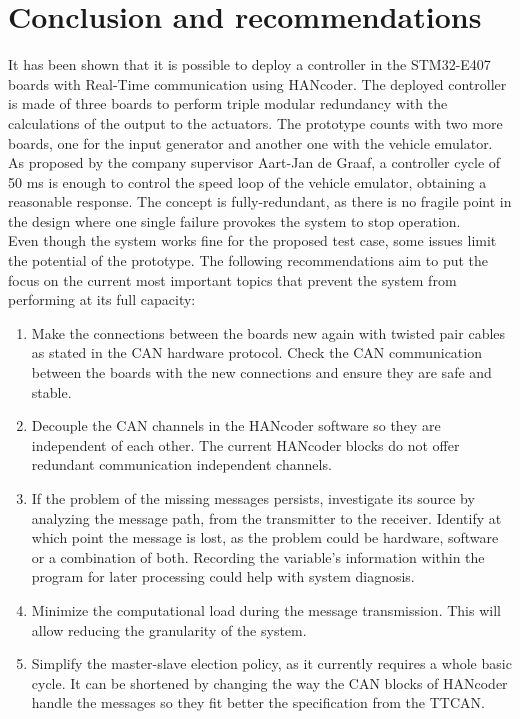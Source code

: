 \documentclass[table,xcdraw]{article}
\begin{document}
\newpage
\section{Conclusion and recommendations} \label{sec:Conclusion}
It has been shown that it is possible to deploy a controller in the STM32-E407 boards with Real-Time communication using HANcoder. The deployed controller is made of three boards to perform triple modular redundancy with the calculations of the output to the actuators. The prototype counts with two more boards, one for the input generator and another one with the vehicle emulator. As proposed by the company supervisor Aart-Jan de Graaf, a controller cycle of 50 ms is enough to control the speed loop of the vehicle emulator, obtaining a reasonable response. The concept is fully-redundant, as there is no fragile point in the design where one single failure provokes the system to stop operation.\\

Even though the system works fine for the proposed test case, some issues limit the potential of the prototype. The following recommendations aim to put the focus on the current most important topics that prevent the system from performing at its full capacity:
\begin{enumerate}
    \item Make the connections between the boards new again with twisted pair cables as stated in the CAN hardware protocol. Check the CAN communication between the boards with the new connections and ensure they are safe and stable.
    \item Decouple the CAN channels in the HANcoder software so they are independent of each other. The current HANcoder blocks do not offer redundant communication independent channels.
    \item If the problem of the missing messages persists, investigate its source by analyzing the message path, from the transmitter to the receiver. Identify at which point the message is lost, as the problem could be hardware, software or a combination of both. Recording the variable's information within the program for later processing could help with system diagnosis.
    \item Minimize the computational load during the message transmission. This will allow reducing the granularity of the system.
    \item Simplify the master-slave election policy, as it currently requires a whole basic cycle. It can be shortened by changing the way the CAN blocks of HANcoder handle the messages so they fit better the specification from the TTCAN.
\end{enumerate}
\end{document}
